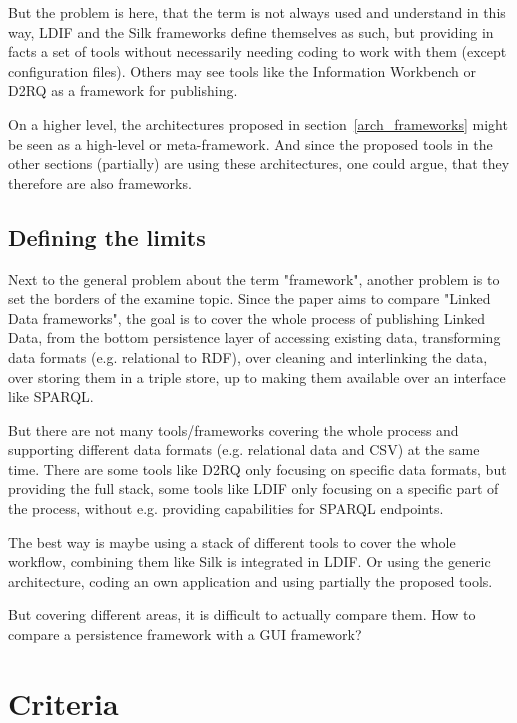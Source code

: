 But the problem is here, that the term is not always used and understand in this way, LDIF and the Silk frameworks define themselves as such, but providing in facts a set of tools without necessarily needing coding to work with them (except configuration files). Others may see tools like the Information Workbench or D2RQ as a framework for publishing.

On a higher level, the architectures proposed in section~\ref{arch_frameworks} might be seen as a high-level or meta-framework. And since the proposed tools in the other sections (partially) are using these architectures, one could argue, that they therefore are also frameworks.

\subsection{Defining the limits}

Next to the general problem about the term "framework", another problem is to set the borders of the examine topic. Since the paper aims to compare "Linked Data frameworks", the goal is to cover the whole process of publishing Linked Data, from the bottom persistence layer of accessing existing data, transforming data formats (e.g. relational to RDF), over cleaning and interlinking the data, over storing them in a triple store, up to making them available over an interface like SPARQL.

But there are not many tools/frameworks covering the whole process and supporting different data formats (e.g. relational data and CSV) at the same time. There are some tools like D2RQ only focusing on specific data formats, but providing the full stack, some tools like LDIF only focusing on a specific part of the process, without e.g. providing capabilities for SPARQL endpoints.

The best way is maybe using a stack of different tools to cover the whole workflow, combining them like Silk is integrated in LDIF. Or using the generic architecture, coding an own application and using partially the proposed tools.

But covering different areas, it is difficult to actually compare them. How to compare a persistence framework with a GUI framework?

\section{Criteria}

